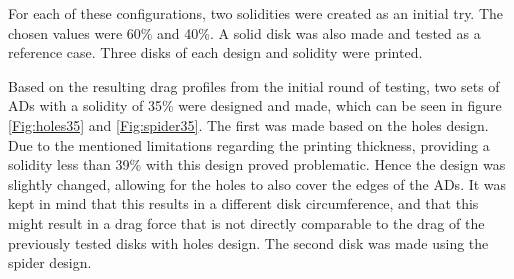 For each of these configurations, two solidities were created as an initial try. The chosen values were 60\% and 40\%. A solid disk was also made and tested as a reference case. Three disks of each design and solidity were printed. 

Based on the resulting drag profiles from the initial round of testing, two sets of \gls{AD}s with a solidity of 35\% were designed and made, which can be seen in figure \ref{Fig:holes35} and \ref{Fig:spider35}. The first was made based on the \gls{holes} design. Due to the mentioned limitations regarding the printing thickness, providing a solidity less than 39\% with this design proved problematic. Hence the design was slightly changed, allowing for the holes to also cover the edges of the \gls{AD}s. It was kept in mind that this results in a different disk circumference, and that this might result in a drag force that is not directly comparable to the drag of the previously tested disks with \gls{holes} design. The second disk was made using the \gls{spider} design. 

